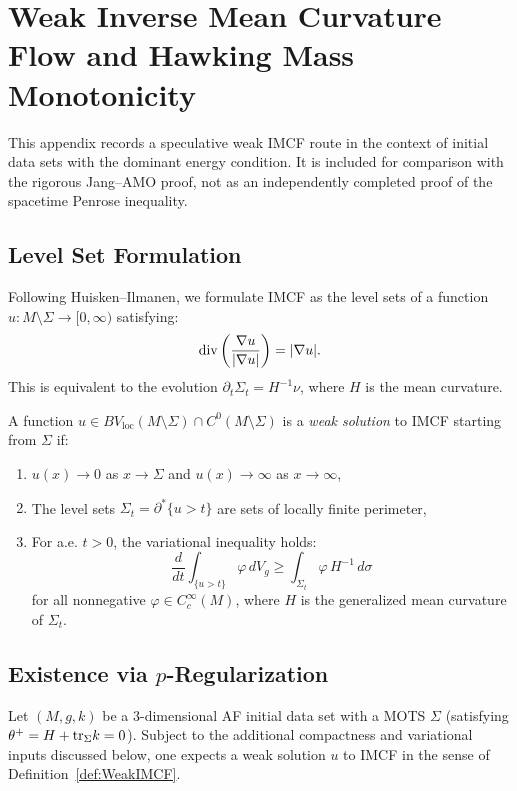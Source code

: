 \section{Weak Inverse Mean Curvature Flow and Hawking Mass Monotonicity}
\label{app:WeakIMCF}

This appendix records a speculative weak IMCF route in the context of initial data sets with the dominant energy condition. It is included for comparison with the rigorous Jang--AMO proof, not as an independently completed proof of the spacetime Penrose inequality.

\subsection{Level Set Formulation}
Following Huisken--Ilmanen, we formulate IMCF as the level sets of a function $u: M \setminus \Sigma \to [0, \infty)$ satisfying:
\begin{equation}\label{eq:LevelSetIMCF}
    \mathrm{div}\left( \frac{\nabla u}{|\nabla u|} \right) = |\nabla u|.
\end{equation}
This is equivalent to the evolution $\partial_t \Sigma_t = H^{-1} \nu$, where $H$ is the mean curvature.

\begin{definition}\label{def:WeakIMCF}
A function $u \in BV_{\mathrm{loc}}(M \setminus \Sigma) \cap C^0(M \setminus \Sigma)$ is a \emph{weak solution} to IMCF starting from $\Sigma$ if:
\begin{enumerate}
    \item $u(x) \to 0$ as $x \to \Sigma$ and $u(x) \to \infty$ as $x \to \infty$,
    \item The level sets $\Sigma_t = \partial^* \{u > t\}$ are sets of locally finite perimeter,
    \item For a.e. $t > 0$, the variational inequality holds:
    \begin{equation}\label{eq:WeakIMCFVar}
        \frac{d}{dt} \int_{\{u > t\}} \varphi \, dV_g \ge \int_{\Sigma_t} \varphi \, H^{-1} \, d\sigma
    \end{equation}
    for all nonnegative $\varphi \in C^\infty_c(M)$, where $H$ is the generalized mean curvature of $\Sigma_t$.
\end{enumerate}
\end{definition}

\subsection{Existence via \texorpdfstring{$p$}{p}-Regularization}
\begin{theorem}\label{thm:ExistenceWeakIMCF}
Let $(M, g, k)$ be a 3-dimensional AF initial data set with a MOTS $\Sigma$ (satisfying $\theta^+ = H + \mathrm{tr}_\Sigma k = 0$). Subject to the additional compactness and variational inputs discussed below, one expects a weak solution $u$ to IMCF in the sense of Definition~\ref{def:WeakIMCF}.
\end{theorem}

